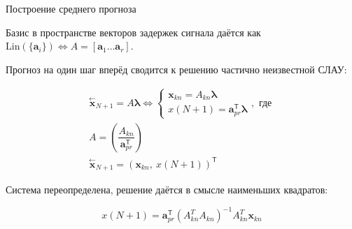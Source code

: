 \documentclass[10pt]{beamer}
\newcommand{\delayV}[1]{\overset{\leftarrow}{\textbf{x}}_{#1}}
\theoremstyle{definition}
\begin{document}
	\begin{frame}{Построение среднего прогноза}
		
		Базис в пространстве векторов задержек сигнала даётся как $ \text{Lin}(\{\mathbf{a}_i\}) \Leftrightarrow A = [\mathbf{a}_1 \ldots \mathbf{a}_r] $. 
		
		Прогноз на один шаг вперёд сводится к решению частично неизвестной СЛАУ:
		
		\begin{gather*}\label{eq:main_pred_for_A}
			\delayV{N + 1} = A \boldsymbol{\lambda} \Leftrightarrow \begin{cases}
				\mathbf{x}_{kn} = A_{kn} \boldsymbol{\lambda}  \\
				x(N + 1) = \mathbf{a}_{pr}^{\mathsf{T}} \boldsymbol{\lambda}
			\end{cases}, \text{ где } \\
			A = \left( \dfrac{A_{kn}}{\mathbf{a}_{pr}^{\mathsf{T}}} \right) \nonumber \\
			\delayV{N + 1} = (\mathbf{x}_{kn}, \  x(N + 1))^{\mathsf{T}} \nonumber
		\end{gather*}
		
		Система переопределена, решение даётся в смысле наименьших квадратов:
		
		\begin{equation*}
			x(N + 1) = \mathbf{a}_{pr}^{\mathsf{T}} (A_{kn}^T A_{kn})^{-1} A_{kn}^T \mathbf{x}_{kn}
		\end{equation*}
		
		
	\end{frame}
	
\end{document}
